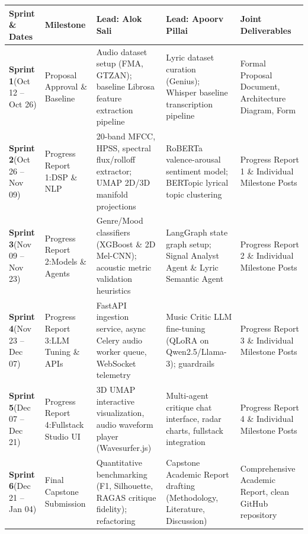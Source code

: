 \documentclass[11pt,a4paper]{article}
\begin{document}
\begin{table}[htbp]
\centering
\scriptsize
\renewcommand{\arraystretch}{1.3}
\begin{tabularx}{\textwidth}{p{1.8cm} p{2.2cm} X X p{2.4cm}}
\toprule
\rowcolor{tableheader}
\textbf{Sprint \& Dates} & \textbf{Milestone} & \textbf{Lead: Alok Sali} & \textbf{Lead: Apoorv Pillai} & \textbf{Joint Deliverables} \\
\midrule
\textbf{Sprint 1}\newline(Oct 12 -- Oct 26) & Proposal Approval \& Baseline & Audio dataset setup (FMA, GTZAN); baseline Librosa feature extraction pipeline & Lyric dataset curation (Genius); Whisper baseline transcription pipeline & Formal Proposal Document, Architecture Diagram, Form \\
\midrule
\textbf{Sprint 2}\newline(Oct 26 -- Nov 09) & Progress Report 1:\newline DSP \& NLP & 20-band MFCC, HPSS, spectral flux/rolloff extractor; UMAP 2D/3D manifold projections & RoBERTa valence-arousal sentiment model; BERTopic lyrical topic clustering & Progress Report 1 \& Individual Milestone Posts \\
\midrule
\textbf{Sprint 3}\newline(Nov 09 -- Nov 23) & Progress Report 2:\newline Models \& Agents & Genre/Mood classifiers (XGBoost \& 2D Mel-CNN); acoustic metric validation heuristics & LangGraph state graph setup; Signal Analyst Agent \& Lyric Semantic Agent & Progress Report 2 \& Individual Milestone Posts \\
\midrule
\textbf{Sprint 4}\newline(Nov 23 -- Dec 07) & Progress Report 3:\newline LLM Tuning \& APIs & FastAPI ingestion service, async Celery audio worker queue, WebSocket telemetry & Music Critic LLM fine-tuning (QLoRA on Qwen2.5/Llama-3); guardrails & Progress Report 3 \& Individual Milestone Posts \\
\midrule
\textbf{Sprint 5}\newline(Dec 07 -- Dec 21) & Progress Report 4:\newline Fullstack Studio UI & 3D UMAP interactive visualization, audio waveform player (Wavesurfer.js) & Multi-agent critique chat interface, radar charts, fullstack integration & Progress Report 4 \& Individual Milestone Posts \\
\midrule
\textbf{Sprint 6}\newline(Dec 21 -- Jan 04) & Final Capstone Submission & Quantitative benchmarking (F1, Silhouette, RAGAS critique fidelity); refactoring & Capstone Academic Report drafting (Methodology, Literature, Discussion) & Comprehensive Academic Report, clean GitHub repository \\

\end{tabularx}
\end{table}
\end{document}
